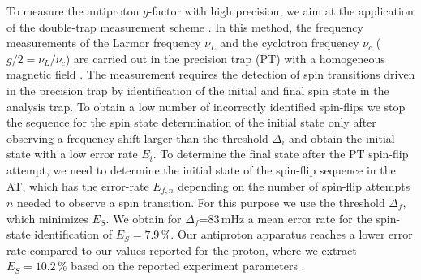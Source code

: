 \documentclass[12pt,preprint%
]{elsarticle}
\begin{document}
To measure the antiproton $g$-factor with high precision, we aim at the application of the double-trap measurement scheme \cite{haeffner2003double,MooserPLB2013}. In this method, the frequency measurements of the Larmor frequency $\nu_L$ and the cyclotron frequency $\nu_c$ ($g/2 = \nu_L/\nu_c$) are carried out in the precision trap (PT) with a homogeneous magnetic field \cite{MooserNature2014}. The measurement requires the detection of spin transitions driven in the precision trap by identification of the initial and final spin state in the analysis trap. To obtain a low number of incorrectly identified spin-flips we stop the sequence for the spin state determination of the initial state only after observing a frequency shift larger than the threshold $\Delta_i$ and obtain the initial state with a low error rate $E_i$. To determine the final state after the PT spin-flip attempt, we need to determine the initial state of the spin-flip sequence in the AT, which has the error-rate $E_{f,n}$ depending on the number of spin-flip attempts $n$ needed to observe a spin transition. For this purpose we use the threshold $\Delta_f$, which minimizes $E_S$. We obtain for $\Delta_f$=83$\,$mHz a mean error rate for the spin-state identification of $E_S=7.9\,\%$. Our antiproton apparatus reaches a lower error rate compared to our values reported for the proton, where we extract $E_S = 10.2\,\%$ based on the reported experiment parameters \cite{MooserPRL2013}.
\end{document}
